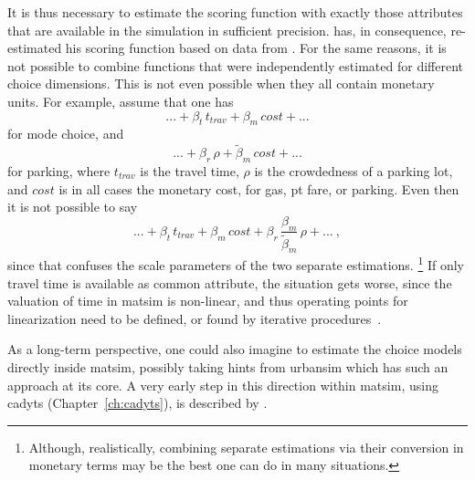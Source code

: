 It is thus necessary to estimate the scoring function with exactly those attributes that are available in the simulation in sufficient precision.
%
\citet[][]{Kickhoefer_MastersThesis_2009} has, in consequence, re-estimated his scoring function based on data from \citet[][]{VrticEtc2008ReisekostenSVIBericht}. 
%
For the same reasons, it is not possible to combine functions that were independently estimated for different choice dimensions.  This is not even possible when they all contain monetary units.  For example, assume that one has
\[
... + \beta_{t} \, t_{trav} + \beta_{m} \, cost + ...
\]
for mode choice, and
\[
... + \beta_r \, \rho + \tilde\beta_{m} \, cost + ...
\]
for parking, where $t_{trav}$ is the travel time, $\rho$ is the crowdedness of a parking lot, and $cost$ is in all cases the monetary cost, \eg for gas, \gls{pt} fare, or parking.  Even then it is not possible to say
\[
... + \beta_{t} \, t_{trav} + \beta_{m} \, cost 
%
+ \beta_r \, \frac{\beta_m}{\tilde\beta_m} \, \rho + ... \ ,
\]
since that confuses the scale parameters of the two separate estimations.%
\footnote{%
%
Although, realistically, combining separate estimations via their conversion in monetary terms may be the best one can do in many situations.
%
} If only travel time is available as common attribute, the situation gets worse, since the valuation of time in \gls{matsim} is non-linear, and thus operating points for linearization need to be defined, or found by iterative procedures~\citep[][p.75ff]{Horni_PhDThesis_2013}.

As a long-term perspective, one could also imagine to estimate the choice models directly inside \gls{matsim}, possibly taking hints from \gls{urbansim} which has such an approach at its core.  A very early step in this direction within \gls{matsim}, using \gls{cadyts} (Chapter~\ref{ch:cadyts}), is described by \citet{FloetteroedChenNagel2012ChoiceModelRefinement}.



